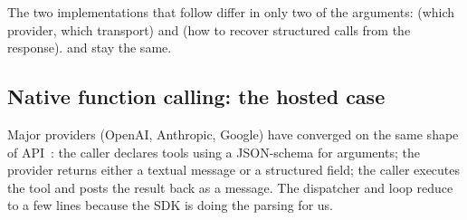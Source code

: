 \noindent
The two implementations that follow differ in only two of the
arguments:  (which provider, which transport) and
 (how to recover structured calls from the response).
 and  stay the same.

\subsection{Native function calling: the hosted case}
\label{sec:impl-hosted}

Major providers (OpenAI, Anthropic, Google) have converged on the
same shape of
API~\citep{openai2024functioncalling,anthropic2024toolusage}: the
caller declares tools using a JSON-schema for arguments; the provider
returns either a textual message or a structured 
field; the caller executes the tool and posts the result back as a
 message. The dispatcher and loop reduce to a few
lines because the SDK is doing the parsing for us.

